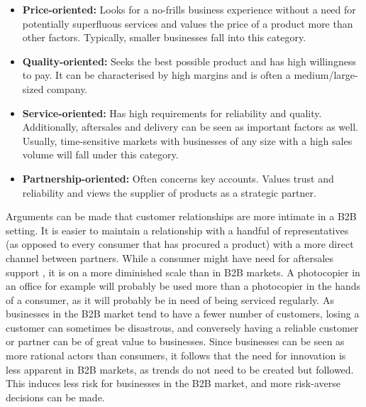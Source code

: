 \begin{itemize}
\item \textbf{Price-oriented: }Looks for a no-frills business experience without a need for potentially superfluous services and values the price of a product more than other factors. Typically, smaller businesses fall into this category.
\item \textbf{Quality-oriented: }Seeks the best possible product and has high willingness to pay. It can be characterised by high margins and is often a medium/large-sized company. 
\item \textbf{Service-oriented: }Has high requirements for reliability and quality. Additionally, aftersales and delivery can be seen as important factors as well. Usually, time-sensitive markets with businesses of any size with a high sales volume will fall under this category. 
\item \textbf{Partnership-oriented: }Often concerns key accounts. Values trust and reliability and views the supplier of products as a strategic partner. 
\end{itemize}
Arguments can be made that customer relationships are more intimate in a B2B setting. It is easier to maintain a relationship with a handful of representatives (as opposed to every consumer that has procured a product) with a more direct channel between partners. While a consumer might have need for aftersales support , it is on a more diminished scale than in B2B markets. A photocopier in an office for example will probably be used more than a photocopier in the hands of a consumer, as it will probably be in need of being serviced regularly. As businesses in the B2B market tend to have a fewer number of customers, losing a customer can sometimes be disastrous, and conversely having a reliable customer or partner can be of great value to businesses. Since businesses can be seen as more rational actors than consumers, it follows that the need for innovation is less apparent in B2B markets, as trends do not need to be created but followed. This induces less risk for businesses in the B2B market, and more risk-averse decisions can be made. 
